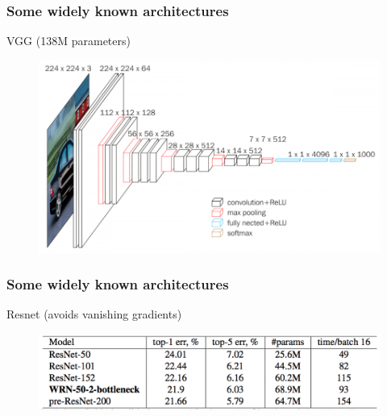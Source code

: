 \documentclass[french,9pt]{beamer}
\begin{document}
\begin{frame}
\frametitle{Some widely known architectures}

VGG (138M parameters) \cite{vgg16} 


\begin{figure}
  \begin{center}
    \includegraphics[width=1\textwidth]{fig/vgg_16.png}
  \end{center}
\end{figure}

\end{frame}



\begin{frame}
\frametitle{Some widely known architectures}

Resnet (avoids vanishing gradients) \cite{resnet,wide_resnet} 


\begin{figure}
  \begin{center}
    \includegraphics[width=1\textwidth]{fig/resnet.png}
  \end{center}
\end{figure}

\end{frame}


\end{document}
